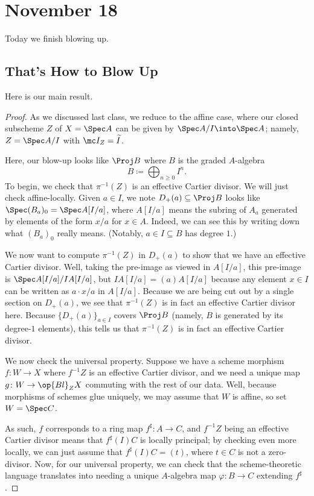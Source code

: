 \documentclass[../notes.tex]{subfiles}
\begin{document}
\section{November 18}

Today we finish blowing up.

\subsection{That's How to Blow Up}
Here is our main result.
\blowupconstrunction*
\begin{proof}
	As we discussed last class, we reduce to the affine case, where our closed subscheme $Z$ of $X=\Spec A$ can be given by $\Spec A/I\into\Spec A$; namely, $Z=\Spec A/I$ with $\mc I_Z=\widetilde I$.

	Here, our blow-up looks like $\Proj B$ where $B$ is the graded $A$-algebra
	\[B\coloneqq\bigoplus_{n\ge0}I^n.\]
	To begin, we check that $\pi^{-1}(Z)$ is an effective Cartier divisor. We will just check affine-locally. Given $a\in I$, we note $D_+(a)\subseteq\Proj B$ looks like $\Spec(B_a)_0=\Spec A[I/a]$, where $A[I/a]$ means the subring of $A_a$ generated by elements of the form $x/a$ for $x\in A$. Indeed, we can see this by writing down what $(B_a)_0$ really means. (Notably, $a\in I\subseteq B$ has degree $1$.)

	We now want to compute $\pi^{-1}(Z)$ in $D_+(a)$ to show that we have an effective Cartier divisor. Well, taking the pre-image as viewed in $A[I/a]$, this pre-image is $\Spec A[I/a]/IA[I/a]$, but $IA[I/a]=(a)A[I/a]$ because any element $x\in I$ can be written as $a\cdot x/a$ in $A[I/a]$. Because we are being cut out by a single section on $D_+(a)$, we see that $\pi^{-1}(Z)$ is in fact an effective Cartier divisor here. Because $\{D_+(a)\}_{a\in I}$ covers $\Proj B$ (namely, $B$ is generated by its degree-$1$ elements), this tells us that $\pi^{-1}(Z)$ is in fact an effective Cartier divisor.

	We now check the universal property. Suppose we have a scheme morphism $f\colon W\to X$ where $f^{-1}Z$ is an effective Cartier divisor, and we need a unique map $g\colon W\to\op{Bl}_ZX$ commuting with the rest of our data. Well, because morphisms of schemes glue uniquely, we may assume that $W$ is affine, so set $W=\Spec C$.

	As such, $f$ corresponds to a ring map $f^\sharp\colon A\to C$, and $f^{-1}Z$ being an effective Cartier divisor means that $f^\sharp(I)C$ is locally principal; by checking even more locally, we can just assume that $f^\sharp(I)C=(t)$, where $t\in C$ is not a zero-divisor. Now, for our universal property, we can check that the scheme-theoretic language translates into needing a unique $A$-algebra map $\varphi\colon B\to C$ extending $f^\sharp$.
	

\end{proof}
\end{document}
